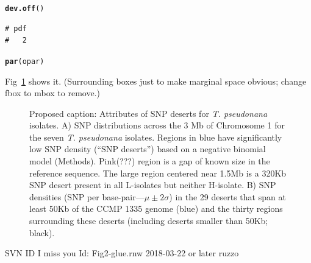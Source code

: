 \documentclass{article}\usepackage[]{graphicx}\usepackage[]{color}
\makeatletter
\newcommand{\hlstd}[1]{\textcolor[rgb]{0.345,0.345,0.345}{#1}}%
\newcommand{\hlkwd}[1]{\textcolor[rgb]{0.737,0.353,0.396}{\textbf{#1}}}%
\newenvironment{kframe}{%
 \def\at@end@of@kframe{}%
 \ifinner\ifhmode%
  \def\at@end@of@kframe{\end{minipage}}%
  \begin{minipage}{\columnwidth}%
 \fi\fi%
 \def\FrameCommand##1{\hskip\@totalleftmargin \hskip-\fboxsep
 \colorbox{shadecolor}{##1}\hskip-\fboxsep
     \hskip-\linewidth \hskip-\@totalleftmargin \hskip\columnwidth}%
 \MakeFramed {\advance\hsize-\width
   \@totalleftmargin\z@ \linewidth\hsize
   \@setminipage}}%
 {\par\unskip\endMakeFramed%
 \at@end@of@kframe}
\newenvironment{knitrout}{}{} %
\makeatother
\begin{document}
\begin{knitrout}
\begin{kframe}
\begin{alltt}
\hlkwd{dev.off}\hlstd{()}
\end{alltt}
\begin{verbatim}
# pdf 
#   2
\end{verbatim}
\begin{alltt}
\hlkwd{par}\hlstd{(opar)}
\end{alltt}
\end{kframe}
\end{knitrout}

Fig~\ref{fig:2a2b} shows it.  (Surrounding boxes just to make marginal space obvious; change fbox to mbox to remove.)
\begin{figure}
  \begin{center}
  \end{center}
  \caption{Proposed caption: Attributes of SNP deserts for {\it T. pseudonana\/} isolates. A) SNP distributions across the 3 Mb of Chromosome 1 for the seven {\it T. pseudonana\/} isolates. Regions in blue have significantly low SNP density (``SNP deserts'') based on a negative binomial model (Methods). Pink(???) region is a gap of known size in the reference sequence. The large region centered near 1.5Mb is a 320Kb SNP desert present in all L-isolates but neither H-isolate. B) SNP densities (SNP per base-pair---$\mu\pm2\sigma$) in the 29 deserts that span at least 50Kb of the CCMP 1335 genome (blue) and the thirty regions surrounding these deserts (including deserts smaller than 50Kb; black).  }
  \label{fig:2a2b}
\end{figure}

\vfill\footnotesize\flushright SVN ID I miss you $ $Id: Fig2-glue.rnw 2018-03-22 or later ruzzo $ $
\end{document}
